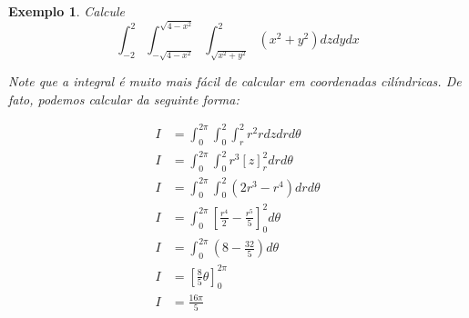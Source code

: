 \documentclass{article}
\newtheorem{example}{Exemplo}[section]
\begin{document}
        \begin{example}
            Calcule
            \[
                \int_{-2}^2 \int_{-\sqrt{4 - x^2}}^{\sqrt{4 - x^2}} \int_{\sqrt{x^2 + y^2}}^2 (x^2 + y^2) dz dy dx
            \]

            Note que a integral é muito mais fácil de calcular em coordenadas cilíndricas. 
            De fato, podemos calcular da seguinte forma:

            \begin{align*}
                I &= \int_0^{2\pi} \int_0^2 \int_r^2 r^2 r dz dr d\theta\\
                I &= \int_0^{2\pi} \int_0^2 r^3 [z]_r^2 dr d\theta\\
                I &= \int_0^{2\pi} \int_0^2 (2r^3 - r^4) dr d\theta\\
                I &= \int_0^{2\pi} \left[ \frac{r^4}{2} - \frac{r^5}{5} \right]_0^2 d\theta\\
                I &= \int_0^{2\pi} \left( 8 - \frac{32}{5} \right) d\theta\\
                I &= \left[\frac{8}{5} \theta \right]_0^{2\pi}\\
                I &= \frac{16\pi}{5}
            \end{align*}
        \end{example}
\end{document}

